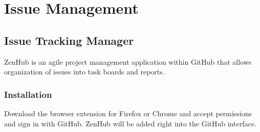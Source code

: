 \documentclass[letterpaper,10pt,english]{sphinxmanual}
\begin{document}
\section{Issue Management}
\label{\detokenize{test_plan/issue_management:issue-management}}\label{\detokenize{test_plan/issue_management::doc}}

\subsection{Issue Tracking Manager}
\label{\detokenize{test_plan/issue_management:issue-tracking-manager}}
ZenHub is an agile project management application within GitHub that allows organization of issues into task boards and reports.


\subsubsection{Installation}
\label{\detokenize{test_plan/issue_management:installation}}
Download the browser extension for Firefox or Chrome and accept permissions and sign in with GitHub. ZenHub will be added right into the GitHub interface.
\end{document}
